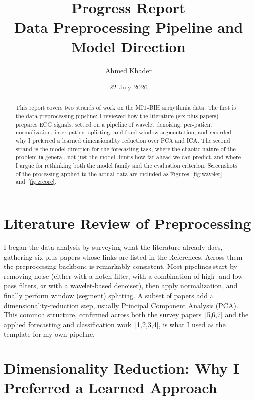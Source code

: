 \documentclass[11pt,a4paper]{article}
\title{Progress Report\\[0.3em]
\large Data Preprocessing Pipeline and Model Direction}
\author{Ahmed Khader}
\date{22 July 2026}
\newcommand{\rc}[1]{\hyperlink{ref#1}{#1}}
\begin{document}
\maketitle

\begin{abstract}
\noindent This report covers two strands of work on the MIT-BIH arrhythmia data.
The first is the data preprocessing pipeline: I reviewed how the literature (six-plus
papers) prepares ECG signals, settled on a pipeline of wavelet denoising, per-patient
normalization, inter-patient splitting, and fixed window segmentation, and recorded why I
preferred a learned dimensionality reduction over PCA and ICA. The second strand is the model
direction for the forecasting task, where the chaotic nature of the problem in general, not
just the model, limits how far ahead we can predict, and where I argue for rethinking both the
model family and the evaluation criterion. Screenshots of the processing applied to the actual
data are included as Figures~\ref{fig:wavelet} and~\ref{fig:zscore}.
\end{abstract}

\section{Literature Review of Preprocessing}

I began the data analysis by surveying what the literature already does, gathering six-plus
papers whose links are listed in the References. Across them the preprocessing backbone is
remarkably consistent. Most pipelines start by removing noise (either with a notch filter,
with a combination of high- and low-pass filters, or with a wavelet-based denoiser), then
apply normalization, and finally perform window (segment) splitting. A subset of papers add a
dimensionality-reduction step, usually Principal Component Analysis (PCA). This common
structure, confirmed across both the survey papers~[\rc{5},\rc{6},\rc{7}] and the applied
forecasting and classification work~[\rc{1},\rc{2},\rc{3},\rc{4}], is what I used as the
template for my own pipeline.

\section{Dimensionality Reduction: Why I Preferred a Learned Approach}
\end{document}
